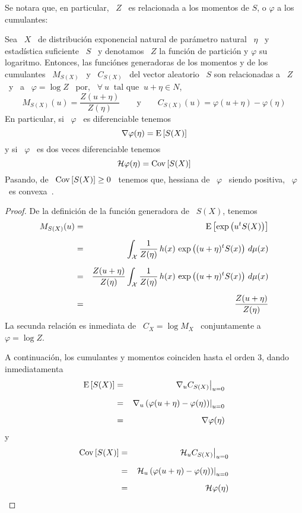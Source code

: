 Se notara que,  en particular, \ $Z$ \  es relacionada a los momentos  de $S$, o
$\varphi$ a los cumulantes:
%
\begin{teorema}
%
  Sea \  $X$ \  de distribuci\'on exponencial  natural de par\'ametro  natural \
  $\eta$ \ y estad\'istica suficiente \ $S$  \ y denotamos \ $Z$ la funci\'on de
  partici\'on y  $\varphi$ su logaritmo.  Entonces,  las funci\'ones generadoras
  de los momentos y de los cumulantes \ $M_{S(X)}$ \ y \ $C_{S(X)}$ \ del vector
  aleatorio \ $S$ son relacionadas a \ $Z$ \ y \ a \ $\varphi = \log Z$ \ por, \
  $\forall \: u \: \mbox{ tal que } \: u+\eta \in N$,
  \[
  M_{S(X)}(u) =  \frac{Z(u+\eta)}{Z(\eta)} \qquad \mbox{y}  \qquad C_{S(X)}(u) =
  \varphi(u+\eta) - \varphi(\eta)
  \]
  En particular, si \  $\varphi$ \ es diferenciable tenemos
  \[
  \nabla \varphi (\eta) = \operatorname{E}\left[ S(X) \right]
  \]
  y si \ $\varphi$ \ es dos veces diferenciable tenemos
  \[
  \mathcal{H} \varphi (\eta) = \operatorname{Cov}\left[ S(X) \right]
  \]
  Pasando, de  \ $\operatorname{Cov}\left[ S(X)  \right] \ge 0$  \ tenemos que, hessiana  de \
  $\varphi$ \ siendo positiva, \ $\varphi$ \ es convexa~\cite{CamMar09}.
%
\end{teorema}
%
\begin{proof}
  De la definici\'on de la funci\'on generadora de \ $S(X)$, tenemos
  \begin{eqnarray*}
  M_{S(X)}(u) & = &\operatorname{E}\left[ \exp\left( u^t S(X) \right) \right]\\[2mm]
  & = & \int_{\mathcal{X}} \frac{1}{Z(\eta)} \, h(x) \, \exp\left( (u + \eta)^t S(x) \right) \,
  d\mu(x)\\[2mm]
  & = & \frac{Z(u+\eta)}{Z(\eta)} \int_{\mathcal{X}} \frac{1}{Z(\eta)} \, h(x) \,
  \exp\left( (u + \eta)^t S(x) \right) \, d\mu(x)\\[2mm]
  & = &  \frac{Z(u+\eta)}{Z(\eta)}
  \end{eqnarray*}
  La secunda  relaci\'on es inmediata  de \ $C_X  = \log M_X$ \  conjuntamente a
  \ $\varphi = \log Z$.

  A continuaci\'on, los cumulantes y momentos coinciden hasta el orden $3$, dando inmediatamenta
  \begin{eqnarray*}
  \operatorname{E}\left[ S(X) \right] & = & \left. \nabla_u C_{S(X)} \right|_{u=0}\\[2mm]
  & = & \left. \nabla_u \left( \varphi(u+\eta) - \varphi(\eta) \right) \right|_{u=0}\\[2mm]
  & = & \nabla \varphi(\eta)
  \end{eqnarray*}
  y
  \begin{eqnarray*}
  \operatorname{Cov}\left[ S(X) \right] & = & \left. \mathcal{H}_u C_{S(X)} \right|_{u=0}\\[2mm]
  & = & \left. \mathcal{H}_u \left( \varphi(u+\eta) - \varphi(\eta)  \right) \right|_{u=0}\\[2mm]
  & = & \mathcal{H} \varphi(\eta)
  \end{eqnarray*}
\end{proof}

